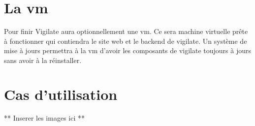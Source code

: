 \section{La vm}
Pour finir Vigilate aura optionnellement une vm. Ce sera machine virtuelle prête à fonctionner qui contiendra le site web et le backend de vigilate. Un système de mise à jours permettra à la vm d’avoir les composants de vigilate toujours à jours sans avoir à la réinstaller.\\

\section{Cas d’utilisation}
** Inserer les images ici **